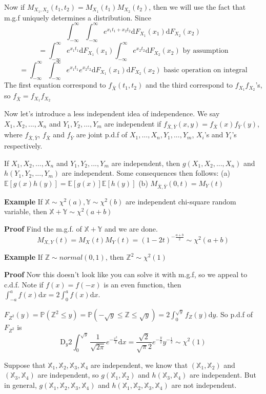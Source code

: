 \documentclass[a4paper,12pt]{article}
\begin{document}
Now if $M_{X_1, X_2}(t_1, t_2) = M_{X_1}(t_1)M_{X_2}(t_2)$, then we will use the fact that m.g.f uniquely determines a distribution.
Since
$$\int_{-\infty}^{\infty}\int_{-\infty}^{\infty} e^{x_1t_1+x_2t_2} \mathrm{d}F_{X_1}(x_1)\mathrm{d}F_{X_2}(x_2)$$
$$= \int_{-\infty}^{\infty}e^{x_1t_1}\mathrm{d}F_{X_1}(x_1)\int_{-\infty}^{\infty}e^{x_2t_2}\mathrm{d}F_{X_2}(x_2) \text{ by assumption}$$
$$= \int_{-\infty}^{\infty}\int_{-\infty}^{\infty} e^{x_1t_1}e^{x_2t_2} \mathrm{d}F_{X_1}(x_1)\mathrm{d}F_{X_2}(x_2) \text{ basic operation on integral}$$
The first equation correspond to $f_{\bar{X}}(t_1, t_2)$ and the third correspond to $f_{X_1}f_{X_2}$'s, so $f_{\bar{X}} = f_{X_1}f_{X_2}$ 

Now let's introduce a less independent idea of independence. We say $X_1, X_2, ..., X_n$ and $Y_1, Y_2, ..., Y_m$ are
independent if $f_{\bar{X}, \bar{Y}}(x, y) = f_{\bar{X}}(x)f_{\bar{Y}}(y)$, where $f_{\bar{X}, \bar{Y}}$, $f_{\bar{X}}$ and $f_{\bar{Y}}$ are joint p.d.f of $X_1, ..., X_n, Y_1, ..., Y_m$, $X_i$'s and $Y_i$'s respectively. 

If $X_1, X_2, ..., X_n$ and $Y_1, Y_2, ..., Y_m$ are independent, then $g(X_1, X_2, ..., X_n)$ and $h(Y_1, Y_2, ..., Y_m)$ are independent. Some consequences then follows: 
(a) $\mathbb{E}[g(x)h(y)] = \mathbb{E}[g(x)]\mathbb{E}[h(y)]$ 
(b) $M_{\bar{X}, \bar{Y}}( 0, t ) = M_Y(t)$ 

\textbf{Example} If $\mathbb{X} \sim \chi^2(a), \mathbb{Y} \sim \chi^2(b)$ are independent chi-square random variable, then $\mathbb{X}+\mathbb{Y} \sim \chi^2(a+b)$ 

\textbf{Proof} Find the m.g.f. of $\mathbb{X}+\mathbb{Y}$ and we are done.
$$M_{X, Y}(t) = M_X(t)M_Y(t) = (1-2t)^{-\frac{a+b}{2}} \sim \chi^2(a+b)$$ 

\textbf{Example} If $\mathbb{Z} \sim normal(0, 1)$, then $\mathbb{Z}^2 \sim \chi^2(1)$ 

\textbf{Proof} Now this doesn't look like you can solve it with m.g.f, so we appeal to c.d.f. Note if $f(x) = f(-x)$ is an even function, then $\int_{-a}^a f(x) \mathrm{d}x = 2\int_0^a f(x) \mathrm{d}x$. 

$F_{Z^2}(y) = \mathbb{P}(\mathbb{Z}^2 \leq y ) = \mathbb{P}(-\sqrt{y} \leq \mathbb{Z} \leq \sqrt{y} ) = 2 \int_0^{\sqrt{y}} f_Z(y) \mathrm{d}y$. 
So p.d.f of $F_{Z^2}$ is 
$$\mathrm{D}_y 2\int_0^{\sqrt{y}} \frac{1}{\sqrt{2\pi}} e^{-\frac{x^2}{2}} \mathrm{d}x = \frac{\sqrt{2}}{\sqrt{\pi}2} e^{-\frac{y}{2}} y^{-\frac{1}{2}} \sim \chi^2(1)$$ 

Suppose that $\mathbb{X}_1, \mathbb{X}_2, \mathbb{X}_3, \mathbb{X}_4$ are independent, we know that $(\mathbb{X}_1, \mathbb{X}_2)$ and $(\mathbb{X}_3, \mathbb{X}_4)$ are independent, so $g(\mathbb{X}_1, \mathbb{X}_2)$ and $h(\mathbb{X}_3, \mathbb{X}_4)$ are independent. But in general, $g(\mathbb{X}_1, \mathbb{X}_2, \mathbb{X}_3, \mathbb{X}_4)$ and $h(\mathbb{X}_1, \mathbb{X}_2, \mathbb{X}_3, \mathbb{X}_4)$ are not independent. 
\end{document}
